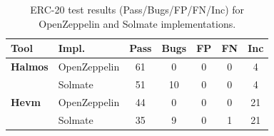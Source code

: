 \begin{table}[htb]
\centering
\begin{scriptsize}
\begin{tabular}{llccccc}
\toprule
\textbf{Tool} & \textbf{Impl.} & \textbf{Pass} & \textbf{Bugs} & \textbf{FP} & \textbf{FN} & \textbf{Inc} \\
\midrule
\textbf{Halmos} & OpenZeppelin & 61 & 0 & 0 & 0 & 4 \\
 & Solmate & 51 & 10 & 0 & 0 & 4 \\
\textbf{Hevm} & OpenZeppelin & 44 & 0 & 0 & 0 & 21 \\
 & Solmate & 35 & 9 & 0 & 1 & 21 \\
\bottomrule
\end{tabular}
\end{scriptsize}
\caption{ERC-20 test results (Pass/Bugs/FP/FN/Inc) for OpenZeppelin and Solmate implementations.}
\label{tab:test_results_erc20}
\end{table}
